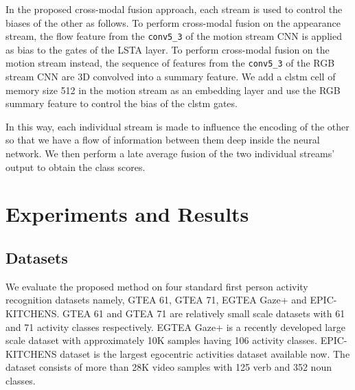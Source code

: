 \documentclass[10pt,twocolumn,letterpaper]{article}
\begin{document}
    In the proposed cross-modal fusion approach, each stream is used to control the biases of the other as follows. To perform cross-modal fusion on the appearance stream, the flow feature from the \verb+conv5_3+ of the motion stream CNN is applied as bias to the gates of the LSTA layer. To perform cross-modal fusion on the motion stream instead, the sequence of features from the \verb+conv5_3+ of the RGB stream CNN are 3D convolved into a summary feature. We add a \ac{clstm} cell of memory size 512 in the motion stream as an embedding layer and use the RGB summary feature to control the bias of the \ac{clstm} gates. 
    


    In this way, each individual stream is made to influence the encoding of the other so that we have a flow of information between them deep inside the neural network. We then perform a late average fusion of the two individual streams' output to obtain the class scores. 





\section{Experiments and Results}
\label{sec:results}
\vspace{-0.1cm}
\subsection{Datasets}
\vspace{-0.1cm}
	We evaluate the proposed method on four standard first person activity recognition datasets namely, GTEA 61, GTEA 71, EGTEA Gaze+ and EPIC-KITCHENS. GTEA 61 and GTEA 71 are relatively small scale datasets with 61 and 71 activity classes respectively. EGTEA Gaze+ is a recently developed large scale dataset with approximately 10K samples having 106 activity classes. EPIC-KITCHENS dataset is the largest egocentric activities dataset available now. The dataset consists of more than 28K video samples with 125 verb and 352 noun classes.
\end{document}

